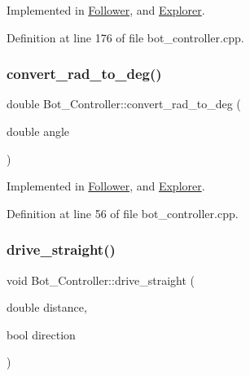 Implemented in \hyperlink{class_follower_a09782942c6aeb9c1797931eb42bc9d20}{Follower}, and \hyperlink{class_explorer_abace49485da40310e567a77689bcb377}{Explorer}.



Definition at line 176 of file bot\+\_\+controller.\+cpp.

\mbox{\label{class_bot___controller_a722a49277ba04f303ca588d80a4910c3}} 
\subsubsection{\texorpdfstring{convert\+\_\+rad\+\_\+to\+\_\+deg()}{convert\_rad\_to\_deg()}}
{\footnotesize\ttfamily double Bot\+\_\+\+Controller\+::convert\+\_\+rad\+\_\+to\+\_\+deg (\begin{DoxyParamCaption}\item[{double}]{angle }\end{DoxyParamCaption})\hspace{0.3cm}{\ttfamily [pure virtual]}}



Implemented in \hyperlink{class_follower_a8d6f37307eb0693f9ca04d31ccfe75ae}{Follower}, and \hyperlink{class_explorer_a00f687c86ecf3de47a1b424a3b2e07ea}{Explorer}.



Definition at line 56 of file bot\+\_\+controller.\+cpp.

\mbox{\label{class_bot___controller_afff936a963b8b3b4b641a7f152b45166}} 
\subsubsection{\texorpdfstring{drive\+\_\+straight()}{drive\_straight()}}
{\footnotesize\ttfamily void Bot\+\_\+\+Controller\+::drive\+\_\+straight (\begin{DoxyParamCaption}\item[{double}]{distance,  }\item[{bool}]{direction }\end{DoxyParamCaption})\hspace{0.3cm}{\ttfamily [pure virtual]}}




